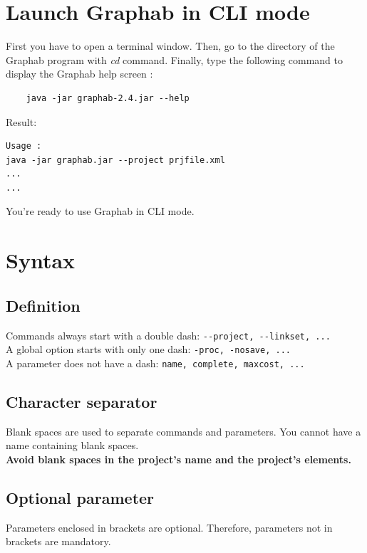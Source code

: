 \documentclass[a4paper,10pt]{report}
\begin{document}
\section{Launch Graphab in CLI mode}
First you have to open a terminal window.
Then, go to the directory of the Graphab program with \textit{cd} command.
Finally, type the following command to display the Graphab help screen :
\begin{Verbatim}
	java -jar graphab-2.4.jar --help
\end{Verbatim}
Result:
\begin{verbatim}
Usage :
java -jar graphab.jar --project prjfile.xml
...
...
\end{verbatim}
You're ready to use Graphab in CLI mode.

\section{Syntax}
\subsection{Definition}
Commands always start with a double dash: \verb|--project, --linkset, ...|\\
A global option starts with only one dash: \verb|-proc, -nosave, ...|\\
A parameter does not have a dash: \verb|name, complete, maxcost, ...|
\subsection{Character separator}
Blank spaces are used to separate commands and parameters. You cannot have a name containing blank spaces.\\
\textbf{Avoid blank spaces in the project's name and the project's elements.}
\subsection{Optional parameter}
Parameters enclosed in brackets are optional. 
Therefore, parameters not in brackets are mandatory.
\end{document}
